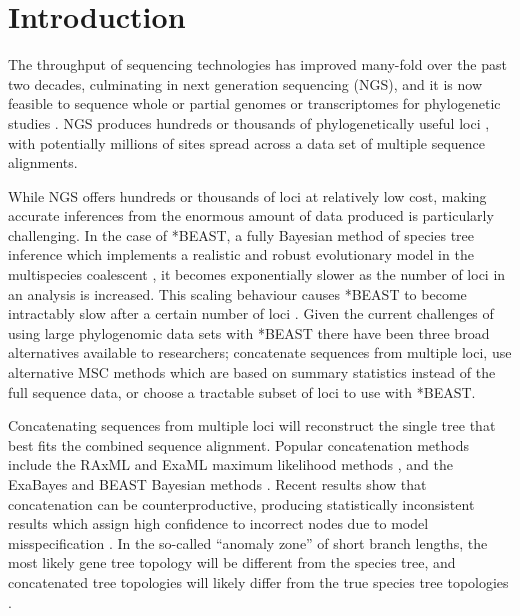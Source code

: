 \documentclass[nogrid]{MBE}%
\begin{document}
\maketitle

\section{Introduction}

The throughput of sequencing technologies has improved many-fold over the past
two decades, culminating in next generation sequencing (NGS), and it is now
feasible to sequence whole or partial genomes or transcriptomes for phylogenetic
studies \citep{annurev-ecolsys-110512-135822}. NGS produces hundreds or
thousands of phylogenetically useful loci \citep[see for example][]{Blom20160181},
with potentially millions of sites spread across a data set of multiple
sequence alignments.

\newpage

While NGS offers hundreds or thousands of loci at relatively low cost, making
accurate inferences from the enormous amount of data produced is particularly
challenging. In the case of *BEAST, a fully Bayesian method of species tree
inference which implements a realistic and robust evolutionary model in the
multispecies coalescent \citep[MSC;][]{Degnan2009332, Heled01032010}, it becomes exponentially
slower as the number of loci in an analysis is increased. This scaling behaviour
causes *BEAST to become intractably slow after a certain number of loci
\citep[the exact number will depend on the other parameters of the data set, see][]{Ogilvie01052016}.
Given the current challenges of using large phylogenomic data sets with *BEAST
there have been three broad alternatives available to researchers; concatenate
sequences from multiple loci, use alternative MSC methods which are based on
summary statistics instead of the full sequence data, or choose a tractable
subset of loci to use with *BEAST.

Concatenating sequences from multiple loci will reconstruct the single tree that
best fits the combined sequence alignment. Popular concatenation methods include
the RAxML and ExaML maximum likelihood methods \citep{Stamatakis01052014,
Kozlov01082015}, and the ExaBayes and BEAST Bayesian methods
\citep{Aberer01102014, Drummond2007}. Recent results show that concatenation
can be counterproductive, producing statistically inconsistent results which assign
high confidence to incorrect nodes due to model misspecification
\citep{NYAS:NYAS12747}. In the so-called ``anomaly zone'' of short branch
lengths, the most likely gene tree topology will be different from the species
tree, and concatenated tree topologies will likely differ from the true species
tree topologies \citep{journal.pgen.0020068, Kubatko01022007}.
\end{document}
